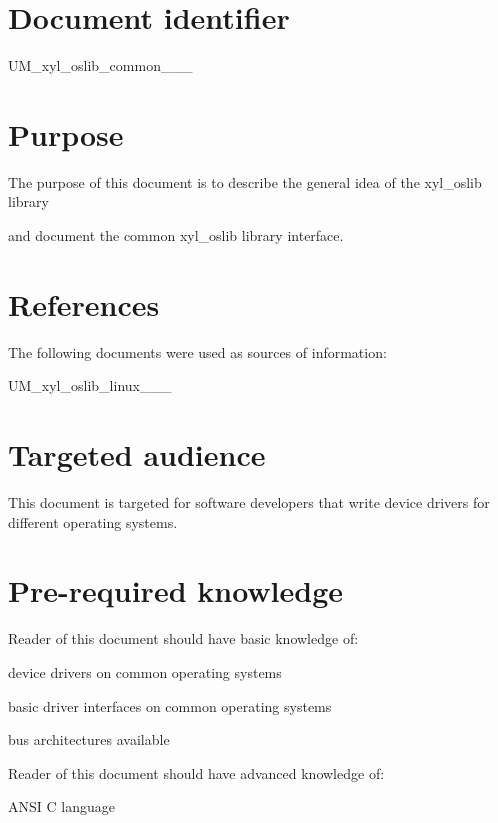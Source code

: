 \hypertarget{p2_p2s1}{}\section{\-Document identifier}\label{p2_p2s1}
\-U\-M\-\_\-xyl\-\_\-oslib\-\_\-common\-\_\-\_\-\_\hypertarget{p2_p2s2}{}\section{\-Purpose}\label{p2_p2s2}
\-The purpose of this document is to describe the general idea of the xyl\-\_\-oslib library \par
 and document the common xyl\-\_\-oslib library interface.\hypertarget{p2_p2s3}{}\section{\-References}\label{p2_p2s3}
\-The following documents were used as sources of information\-:
\begin{DoxyItemize}
\item \-U\-M\-\_\-xyl\-\_\-oslib\-\_\-linux\-\_\-\_\-\_
\end{DoxyItemize}\hypertarget{p2_p2s4}{}\section{\-Targeted audience}\label{p2_p2s4}
\-This document is targeted for software developers that write device drivers for different operating systems.\hypertarget{p2_p2s5}{}\section{\-Pre-\/required knowledge}\label{p2_p2s5}
\-Reader of this document should have basic knowledge of\-: \begin{DoxyItemize}
\item device drivers on common operating systems \item basic driver interfaces on common operating systems \item bus architectures available\end{DoxyItemize}
\-Reader of this document should have advanced knowledge of\-:
\begin{DoxyItemize}
\item \-A\-N\-S\-I \-C language 
\end{DoxyItemize}